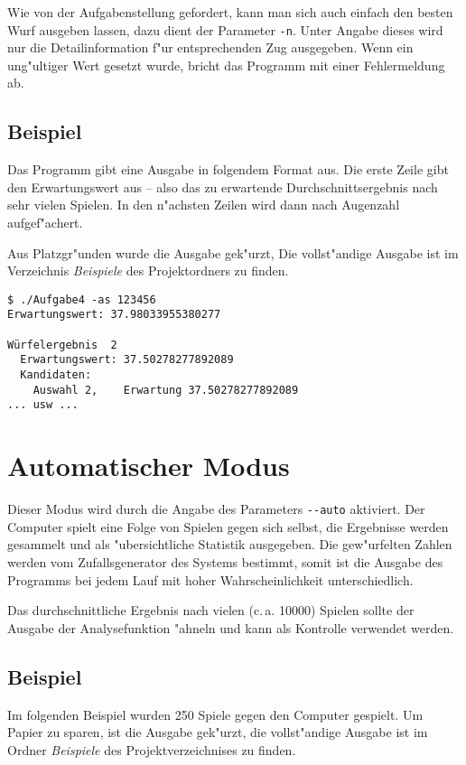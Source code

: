 \documentclass{scrreprt}
\begin{document}
Wie von der Aufgabenstellung gefordert, kann man sich auch einfach den besten
Wurf ausgeben lassen, dazu dient der Parameter \texttt{-n}.  Unter Angabe dieses
wird nur die Detailinformation f"ur entsprechenden Zug ausgegeben. Wenn ein
ung"ultiger Wert gesetzt wurde, bricht das Programm mit einer Fehlermeldung ab.

\subsection*{Beispiel}
Das Programm gibt eine Ausgabe in folgendem Format aus. Die erste Zeile gibt den
Erwartungswert aus -- also das zu erwartende Durchschnittsergebnis nach sehr
vielen Spielen.  In den n"achsten Zeilen wird dann nach Augenzahl aufgef"achert.

Aus Platzgr"unden wurde die Ausgabe gek"urzt, Die vollst"andige Ausgabe ist im
Verzeichnis \emph{Beispiele} des Projektordners zu finden.

\begin{verbatim}
$ ./Aufgabe4 -as 123456
Erwartungswert: 37.98033955380277

Würfelergebnis  2
  Erwartungswert: 37.50278277892089
  Kandidaten:
    Auswahl 2,    Erwartung 37.50278277892089
... usw ...
\end{verbatim}

\section{Automatischer Modus}
Dieser Modus wird durch die Angabe des Parameters \texttt{-\/-auto} aktiviert.
Der Computer spielt eine Folge von Spielen gegen sich selbst, die Ergebnisse
werden gesammelt und als "ubersichtliche Statistik ausgegeben.  Die gew"urfelten
Zahlen werden vom Zufallsgenerator des Systems bestimmt, somit ist die Ausgabe
des Programms bei jedem Lauf mit hoher Wahrscheinlichkeit unterschiedlich.

Das durchschnittliche Ergebnis nach vielen (c.\,a. 10000) Spielen sollte der
Ausgabe der Analysefunktion "ahneln und kann als Kontrolle verwendet werden.

\subsection*{Beispiel}
Im folgenden Beispiel wurden 250 Spiele gegen den Computer gespielt.  Um Papier
zu sparen, ist die Ausgabe gek"urzt, die vollst"andige Ausgabe ist im Ordner
\emph{Beispiele} des Projektverzeichnises zu finden.
\end{document}

